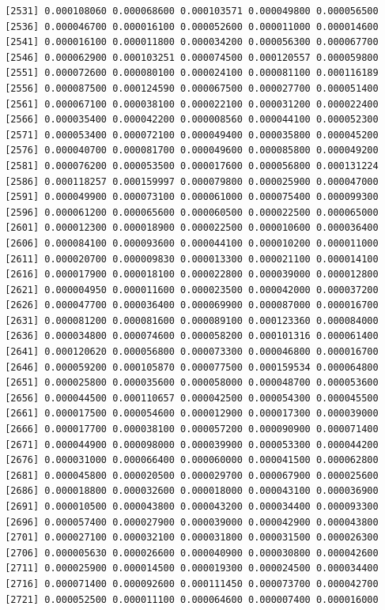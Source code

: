 \documentclass[]{article}
\begin{document}
\begin{verbatim}
 [2531] 0.000108060 0.000068600 0.000103571 0.000049800 0.000056500
 [2536] 0.000046700 0.000016100 0.000052600 0.000011000 0.000014600
 [2541] 0.000016100 0.000011800 0.000034200 0.000056300 0.000067700
 [2546] 0.000062900 0.000103251 0.000074500 0.000120557 0.000059800
 [2551] 0.000072600 0.000080100 0.000024100 0.000081100 0.000116189
 [2556] 0.000087500 0.000124590 0.000067500 0.000027700 0.000051400
 [2561] 0.000067100 0.000038100 0.000022100 0.000031200 0.000022400
 [2566] 0.000035400 0.000042200 0.000008560 0.000044100 0.000052300
 [2571] 0.000053400 0.000072100 0.000049400 0.000035800 0.000045200
 [2576] 0.000040700 0.000081700 0.000049600 0.000085800 0.000049200
 [2581] 0.000076200 0.000053500 0.000017600 0.000056800 0.000131224
 [2586] 0.000118257 0.000159997 0.000079800 0.000025900 0.000047000
 [2591] 0.000049900 0.000073100 0.000061000 0.000075400 0.000099300
 [2596] 0.000061200 0.000065600 0.000060500 0.000022500 0.000065000
 [2601] 0.000012300 0.000018900 0.000022500 0.000010600 0.000036400
 [2606] 0.000084100 0.000093600 0.000044100 0.000010200 0.000011000
 [2611] 0.000020700 0.000009830 0.000013300 0.000021100 0.000014100
 [2616] 0.000017900 0.000018100 0.000022800 0.000039000 0.000012800
 [2621] 0.000004950 0.000011600 0.000023500 0.000042000 0.000037200
 [2626] 0.000047700 0.000036400 0.000069900 0.000087000 0.000016700
 [2631] 0.000081200 0.000081600 0.000089100 0.000123360 0.000084000
 [2636] 0.000034800 0.000074600 0.000058200 0.000101316 0.000061400
 [2641] 0.000120620 0.000056800 0.000073300 0.000046800 0.000016700
 [2646] 0.000059200 0.000105870 0.000077500 0.000159534 0.000064800
 [2651] 0.000025800 0.000035600 0.000058000 0.000048700 0.000053600
 [2656] 0.000044500 0.000110657 0.000042500 0.000054300 0.000045500
 [2661] 0.000017500 0.000054600 0.000012900 0.000017300 0.000039000
 [2666] 0.000017700 0.000038100 0.000057200 0.000090900 0.000071400
 [2671] 0.000044900 0.000098000 0.000039900 0.000053300 0.000044200
 [2676] 0.000031000 0.000066400 0.000060000 0.000041500 0.000062800
 [2681] 0.000045800 0.000020500 0.000029700 0.000067900 0.000025600
 [2686] 0.000018800 0.000032600 0.000018000 0.000043100 0.000036900
 [2691] 0.000010500 0.000043800 0.000043200 0.000034400 0.000093300
 [2696] 0.000057400 0.000027900 0.000039000 0.000042900 0.000043800
 [2701] 0.000027100 0.000032100 0.000031800 0.000031500 0.000026300
 [2706] 0.000005630 0.000026600 0.000040900 0.000030800 0.000042600
 [2711] 0.000025900 0.000014500 0.000019300 0.000024500 0.000034400
 [2716] 0.000071400 0.000092600 0.000111450 0.000073700 0.000042700
 [2721] 0.000052500 0.000011100 0.000064600 0.000007400 0.000016000

\end{verbatim}
\end{document}
